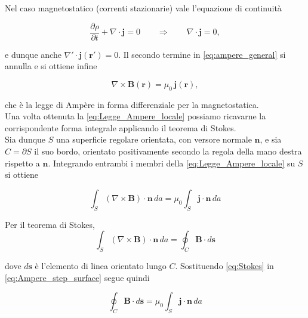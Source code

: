 Nel caso magnetostatico (correnti stazionarie) vale l'equazione di continuità

\begin{equation*}
\frac{\partial \rho}{\partial t}+\nabla\cdot \mathbf j=0
\qquad\Rightarrow\qquad
\nabla\cdot \mathbf j=0,
\end{equation*}

e dunque anche $\nabla'\cdot \mathbf j(\mathbf r')=0$. Il secondo termine in \ref{eq:ampere_general} si annulla e si ottiene infine

\begin{tcolorbox}[colback=yellow!10!white, colframe=orange!70!black, boxrule=0.8pt]
\begin{equation} \label{eq:Legge_Ampere_locale}
    \nabla \times \mathbf B(\mathbf r)=\mu_0\,\mathbf j(\mathbf r),
\end{equation}
\end{tcolorbox}

che è la legge di Ampère in forma differenziale per la  magnetostatica.\\

Una volta ottenuta la \ref{eq:Legge_Ampere_locale} possiamo ricavarne la corrispondente forma integrale applicando il teorema di Stokes.\\

Sia dunque $S$ una superficie regolare orientata, con versore normale $\mathbf n$, e sia $C=\partial S$ il suo bordo, orientato positivamente secondo la regola della mano destra rispetto a $\mathbf n$.
Integrando entrambi i membri della \ref{eq:Legge_Ampere_locale} su $S$ si ottiene

\begin{equation}\label{eq:Ampere_step_surface}
    \int_S (\nabla \times \mathbf B)\cdot \mathbf n\, d a
    =
    \mu_0 \int_S \mathbf j \cdot \mathbf n\, d a
\end{equation}

Per il teorema di Stokes,
\begin{equation}\label{eq:Stokes}
    \int_S (\nabla \times \mathbf B)\cdot \mathbf n\, d a
    =
    \oint_C \mathbf B \cdot d\mathbf{s}
\end{equation}

dove $d\mathbf{s}$ è l'elemento di linea orientato lungo $C$.
Sostituendo \ref{eq:Stokes} in \ref{eq:Ampere_step_surface} segue quindi

\begin{equation}\label{eq:Ampere_integrale_flux}
    \oint_C \mathbf B \cdot d\mathbf{s}
    =
    \mu_0 \int_S \mathbf j \cdot \mathbf n\, d a
\end{equation}

